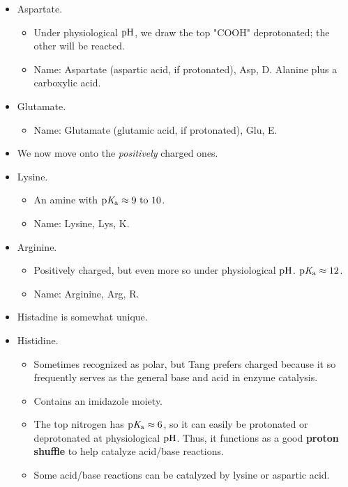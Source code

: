 \documentclass[../notes.tex]{subfiles}
\begin{document}
\begin{itemize}
\begin{itemize}
        \item Aspartate.
        \begin{itemize}
            \item Under physiological $\operatorname{pH}$, we draw the top "COOH" deprotonated; the other will be reacted.
            \item Name: Aspartate (aspartic acid, if protonated), Asp, D. Alanine plus a carboxylic acid.
        \end{itemize}
        \item Glutamate.
        \begin{itemize}
            \item Name: Glutamate (glutamic acid, if protonated), Glu, E.
        \end{itemize}
        \item We now move onto the \emph{positively} charged ones.
        \item Lysine.
        \begin{itemize}
            \item An amine with $\pKa\approx\numrange{9}{10}$.
            \item Name: Lysine, Lys, K.
        \end{itemize}
        \item Arginine.
        \begin{itemize}
            \item Positively charged, but even more so under physiological $\operatorname{pH}$. $\operatorname{p\textit{K}_a}\approx 12$.
            \item Name: Arginine, Arg, R.
        \end{itemize}
        \item Histadine is somewhat unique.
        \item Histidine.
        \begin{itemize}
            \item Sometimes recognized as polar, but Tang prefers charged because it so frequently serves as the general base and acid in enzyme catalysis.
            \item Contains an imidazole moiety.
            \item The top nitrogen has $\operatorname{p\textit{K}_a}\approx 6$, so it can easily be protonated or deprotonated at physiological $\operatorname{pH}$. Thus, it functions as a good \textbf{proton shuffle} to help catalyze acid/base reactions.
            \item Some acid/base reactions can be catalyzed by lysine or aspartic acid.
            \begin{itemize}

\end{itemize}
\end{itemize}
\end{itemize}
\end{itemize}
\end{document}
